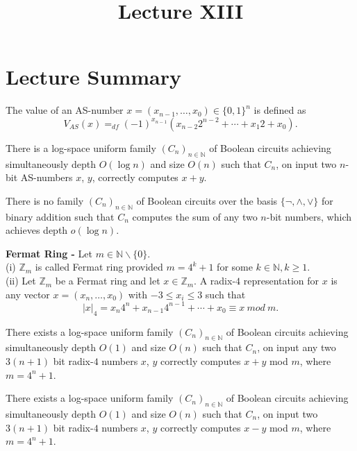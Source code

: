 \documentclass[a4paper]{article}
\title{\vspace{-2cm}Lecture XIII\vspace{-2cm}}
\date{}
\begin{document}
\maketitle
\section{Lecture Summary}
\begin{definition}
The value of an AS-number $x = (x_{n-1}, \ldots, x_{0}) \in \{ 0, 1 \}^{n}$ is defined as
$$V_{AS}(x) =_{df} (-1)^{x_{n-1}}(x_{n-2}2^{n-2} + \cdots + x_{1}2 + x_{0}).$$
\end{definition}


\begin{theorem}
There is a log-space uniform family $(C_{n})_{n \in \mathbb{N}}$ of Boolean circuits achieving simultaneously depth $O(\log{n})$ and size $O(n)$ such that $C_{n}$, on input two $n$-bit AS-numbers $x$, $y$, correctly computes $x + y$.
\end{theorem}


\begin{theorem}
There is no family $(C_{n})_{n \in \mathbb{N}}$ of Boolean circuits over the basis $\{ \lnot, \land, \lor \}$ for binary addition such that $C_{n}$ computes the sum of any two $n$-bit numbers, which achieves depth $o(\log{n})$.
\end{theorem}


\begin{definition}
\textbf{Fermat Ring -} Let $m \in \mathbb{N} \backslash \{ 0 \}$. \\
(i) $\mathbb{Z}_{m}$ is called Fermat ring provided $m = 4^{k} + 1$ for some $k \in \mathbb{N}, k \geq 1$. \\
(ii) Let $\mathbb{Z}_{m}$ be a Fermat ring and let $x \in \mathbb{Z}_{m}$. A radix-$4$ representation for $x$ is any vector $x = (x_{n}, \ldots, x_{0})$ with $-3 \leq x_{i} \leq 3$ such that 
$$|x|_{4} = x_{n}4^{n} + x_{n - 1}4^{n - 1} + \cdots + x_{0} \equiv x\ mod\ m.$$
\end{definition}


\begin{theorem}
There exists a log-space uniform family $(C_{n})_{n \in \mathbb{N}}$ of Boolean circuits achieving simultaneously depth $O(1)$ and size $O(n)$ such that $C_{n}$, on input any two $3(n + 1)$ bit radix-$4$ numbers $x$, $y$ correctly computes $x + y$ mod $m$, where $m = 4^{n} + 1$.
\end{theorem}


\begin{corollary}
There exists a log-space uniform family $(C_{n})_{n \in \mathbb{N}}$ of Boolean circuits achieving simultaneously depth $O(1)$ and size $O(n)$ such that $C_{n}$, on input two $3(n + 1)$ bit radix-$4$ numbers $x$, $y$ correctly computes $x - y$ mod $m$, where $m = 4^{n} + 1$.
\end{corollary}
\end{document}
